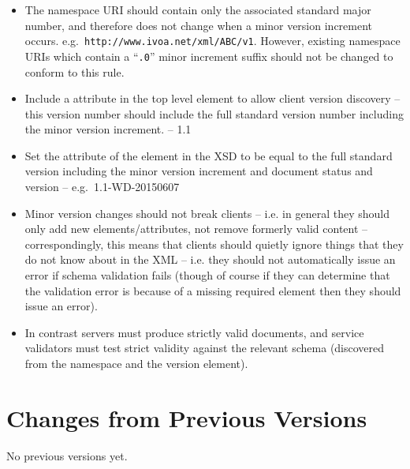 \documentclass[10pt,a4paper]{ivoa}
\begin{document}
\begin{itemize}
\item The namespace URI should contain only the associated standard major number, 
and therefore does not change when a minor version increment occurs.
e.g.\ \texttt{http://www.ivoa.net/xml/ABC/v1}. However, existing namespace URIs
which contain a ``\texttt{.0}'' minor increment suffix should not be changed to
conform to this rule.

\item Include a  attribute in the top level element to allow
client version discovery -- this version number should include the full standard version
number including the minor version increment. -- 1.1

\item Set the  attribute of the  element in the
XSD to be equal to the full standard version including the minor version
increment and document status and version -- e.g.\ 1.1-WD-20150607

\item Minor version changes should not break clients -- i.e. in general they
should only add new elements/attributes, not remove formerly valid
content --
correspondingly, this means that clients should quietly ignore things that they
do not know about in the XML -- i.e. they should not automatically issue an error
if schema validation fails (though of course if they can determine that the
validation error is because of a missing required element then they should
issue an error).
\item In contrast servers must produce strictly valid documents, and service
validators must test strict validity against the relevant schema (discovered
from the namespace and the version element).
\end{itemize}




\appendix


\section{Changes from Previous Versions}

No previous versions yet.  



\end{document}
